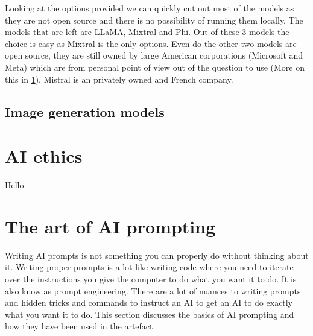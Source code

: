 Looking at the options provided we can quickly cut out most of the models as they are not open source and there is no possibility of running them locally. The models that are left are LLaMA, Mixtral and Phi. Out of these 3 models the choice is easy as Mixtral is the only options. Even do the other two models are open source, they are still owned by large American corporations (Microsoft and Meta) which are from personal point of view out of the question to use (More on this in \ref{AIethics}). Mistral is an privately owned and French company.

\subsection{Image generation models} 

\cite{bie2024renaissance}


\section{AI ethics} \label{AIethics}
Hello

\section{The art of AI prompting}
Writing AI prompts is not something you can properly do without thinking about it. Writing proper prompts is a lot like writing code where you need to iterate over the instructions you give the computer to do what you want it to do. It is also know as prompt engineering. There are a lot of nuances to writing prompts and hidden tricks and commands to instruct an AI to get an AI to do exactly what you want it to do. This section discusses the basics of AI prompting and how they have been used in the artefact.

\cite{dang2022prompt}
